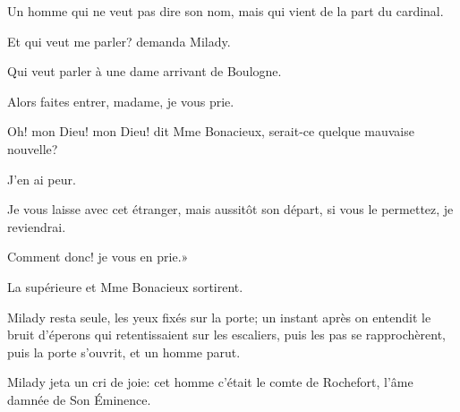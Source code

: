 \speak  Un homme qui ne veut pas dire son nom, mais qui vient de la part du cardinal. 

\speak  Et qui veut me parler? demanda Milady. 

\speak  Qui veut parler à une dame arrivant de Boulogne. 

\speak  Alors faites entrer, madame, je vous prie. 

\speak  Oh! mon Dieu! mon Dieu! dit Mme Bonacieux, serait-ce quelque mauvaise nouvelle? 

\speak  J'en ai peur. 

\speak  Je vous laisse avec cet étranger, mais aussitôt son départ, si vous le permettez, je reviendrai. 

\speak  Comment donc! je vous en prie.» 

La supérieure et Mme Bonacieux sortirent. 

Milady resta seule, les yeux fixés sur la porte; un instant après on entendit le bruit d'éperons qui retentissaient sur les escaliers, puis les pas se rapprochèrent, puis la porte s'ouvrit, et un homme parut. 

Milady jeta un cri de joie: cet homme c'était le comte de Rochefort, l'âme damnée de Son Éminence.